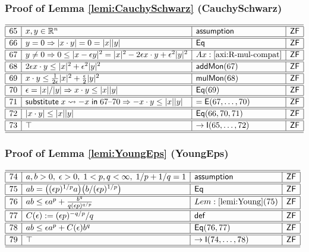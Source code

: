 \documentclass[11pt,reqno]{amsart}
\begin{document}
\medskip

\subsubsection*{Proof of Lemma \ref{lemi:CauchySchwarz} (\textsf{CauchySchwarz})}

\noindent$%
\begin{array}{|r|l|l|l|}
\hline\hline
65 & x,y\in\mathbb{R}^{n} & \mathsf{assumption} & \mathsf{ZF} \\ \hline\hline
66 & y=0\Rightarrow|x\cdot y|=0=|x||y| & \mathsf{Eq} & \mathsf{ZF} \\ \hline\hline
67 & y\neq0\Rightarrow0\le|x-\epsilon y|^{2}=|x|^{2}-2\epsilon x\cdot y+\epsilon^{2}|y|^{2} & Ax:\ref{axi:R-mul-compat} & \mathsf{ZF} \\ \hline\hline
68 & 2\epsilon x\cdot y\le|x|^{2}+\epsilon^{2}|y|^{2} & \mathsf{addMon}(67) & \mathsf{ZF} \\ \hline\hline
69 & x\cdot y\le\tfrac{1}{2\epsilon}|x|^{2}+\tfrac{\epsilon}{2}|y|^{2} & \mathsf{mulMon}(68) & \mathsf{ZF} \\ \hline\hline
70 & \epsilon=|x|/|y|\Rightarrow x\cdot y\le|x||y| & \mathsf{Eq}(69) & \mathsf{ZF} \\ \hline\hline
71 & \mathsf{substitute}\;x\rightsquigarrow-x\;\mathsf{in}\;67\text{--}70\Rightarrow-x\cdot y\le|x||y| & =\mathsf{E}(67,\dots,70) & \mathsf{ZF} \\ \hline\hline
72 & |x\cdot y|\le|x||y| & \mathsf{Eq}(66,70,71) & \mathsf{ZF} \\ \hline\hline
73 & \top & \to\mathsf{I}(65,\dots,72) & \mathsf{ZF} \\ \hline\hline
\end{array}%
$

\medskip

\subsubsection*{Proof of Lemma \ref{lemi:YoungEps} (\textsf{YoungEps})}

\noindent$%
\begin{array}{|r|l|l|l|}
\hline\hline
74 & a,b>0,\;\epsilon>0,\;1<p,q<\infty,\;1/p+1/q=1 & \mathsf{assumption} & \mathsf{ZF} \\ \hline\hline
75 & ab=\bigl((\epsilon p)^{1/p}a\bigr)\bigl(b/(\epsilon p)^{1/p}\bigr) & \mathsf{Eq} & \mathsf{ZF} \\ \hline\hline
76 & ab\le\epsilon a^{p}+\frac{b^{q}}{q(\epsilon p)^{q/p}} & Lem:\ref{lemi:Young}(75) & \mathsf{ZF} \\ \hline\hline
77 & C(\epsilon):=(\epsilon p)^{-q/p}/q & \mathsf{def} & \mathsf{ZF} \\ \hline\hline
78 & ab\le\epsilon a^{p}+C(\epsilon)b^{q} & \mathsf{Eq}(76,77) & \mathsf{ZF} \\ \hline\hline
79 & \top & \to\mathsf{I}(74,\dots,78) & \mathsf{ZF} \\ \hline\hline
\end{array}%
$
\end{document}

